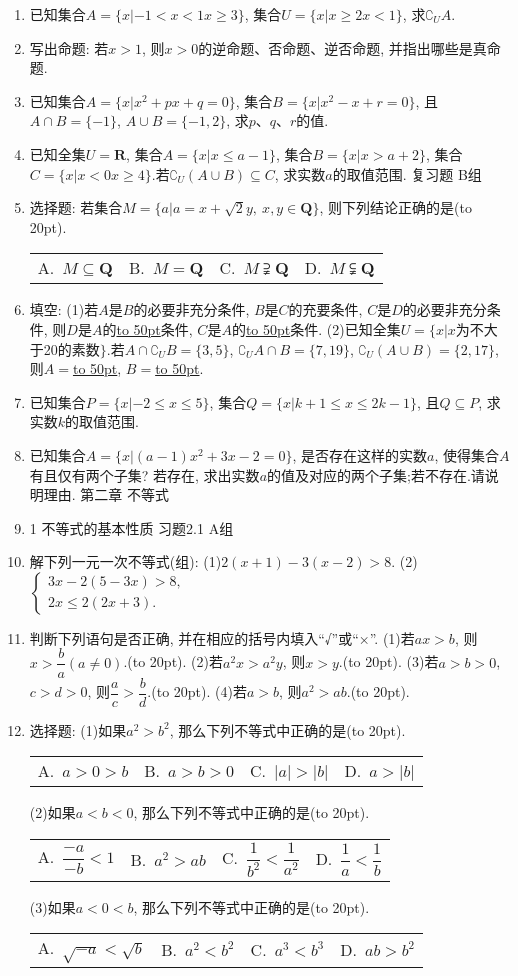 \documentclass[10pt,a4paper]{article}
\newcommand{\blank}[1]{\underline{\hbox to #1pt{}}}
\newcommand{\bracket}[1]{(\hbox to #1pt{})}
\newcommand{\fourch}[4]{\par\begin{tabular}{p{.23\textwidth}p{.23\textwidth}p{.23\textwidth}p{.23\textwidth}}
A.~#1 &B.~#2& C.~#3& D.~#4
\end{tabular}}
\begin{document}
\begin{enumerate}[1.]
\item 已知集合$A=\{x|-1<x<1x\ge 3\}$, 集合$U=\{x|x\ge 2x<1\}$, 求$\complement _UA$.
\item 写出命题: 若$x>1$, 则$x>0$的逆命题、否命题、逆否命题, 并指出哪些是真命题.
\item 已知集合$A=\{x|x^2+px+q=0\}$, 集合$B=\{x|x^2-x+r=0\}$, 且$A\cap B=\{-1\}$, $A\cup B=\{-1,2\}$, 求$p$、$q$、$r$的值.
\item 已知全集$U=\mathbf{R}$, 集合$A=\{x|x\le a-1\}$, 集合$B=\{x|x>a+2\}$, 集合$C=\{x|x<0x\ge 4\}$.若$\complement _U(A\cup B)\subseteq C$, 求实数$a$的取值范围.
复习题
B组
\item 选择题:
若集合$M=\{a|a=x+\sqrt 2y,\ x,y\in \mathbf{Q}\}$, 则下列结论正确的是\bracket{20}.
\fourch{$M\subseteq \mathbf{Q}$}{$M=\mathbf{Q}$}{$M\supsetneqq \mathbf{Q}$}{$M\subsetneqq \mathbf{Q}$}
\item 填空:
(1)若$A$是$B$的必要非充分条件, $B$是$C$的充要条件, $C$是$D$的必要非充分条件, 则$D$是$A$的\blank{50}条件, $C$是$A$的\blank{50}条件.
(2)已知全集$U=\{x|x$为不大于20的素数$\}$.若$A\cap \complement _UB=\{3,5\}$, $\complement _UA\cap B=\{7,19\}$, $\complement _U(A\cup B)=\{2,17\}$, 则$A=$\blank{50}, $B=$\blank{50}.
\item 已知集合$P=\{x|-2\le x\le 5\}$, 集合$Q=\{x|k+1\le x\le 2k-1\}$, 且$Q\subseteq P$, 求实数$k$的取值范围.
\item 已知集合$A=\{x|(a-1)x^2+3x-2=0\}$, 是否存在这样的实数$a$, 使得集合$A$有且仅有两个子集? 若存在, 求出实数$a$的值及对应的两个子集;若不存在.请说明理由.
第二章  不等式
\item 1  不等式的基本性质
习题2.1  A组
\item 解下列一元一次不等式(组):
(1)$2(x+1)-3(x-2)>8$.
(2)$\begin{cases} 3x-2(5-3x)>8, \\ 2x\le 2(2x+3). \end{cases}$
\item 判断下列语句是否正确, 并在相应的括号内填入``√''或``×''.
(1)若$ax>b$, 则$x>\dfrac ba(a\ne 0)$.\bracket{20}.
(2)若$a^2x>a^2y$, 则$x>y$.\bracket{20}.
(3)若$a>b>0$, $c>d>0$, 则$\dfrac ac>\dfrac bd$.\bracket{20}.
(4)若$a>b$, 则$a^2>ab$.\bracket{20}.
\item 选择题:
(1)如果$a^2>b^2$, 那么下列不等式中正确的是\bracket{20}.
\fourch{$a>0>b$}{$a>b>0$}{$|a|>|b|$}{$a>|b|$}
(2)如果$a<b<0$, 那么下列不等式中正确的是\bracket{20}.
\fourch{$\dfrac{-a}{-b}<1$}{$a^2>ab$}{$\dfrac 1{b^2}<\dfrac 1{a^2}$}{$\dfrac 1a<\dfrac 1b$}
(3)如果$a<0<b$, 那么下列不等式中正确的是\bracket{20}.
\fourch{$\sqrt {-a}<\sqrt b$}{$a^2<b^2$}{$a^3<b^3$}{$ab>b^2$}

\end{enumerate}
\end{document}
